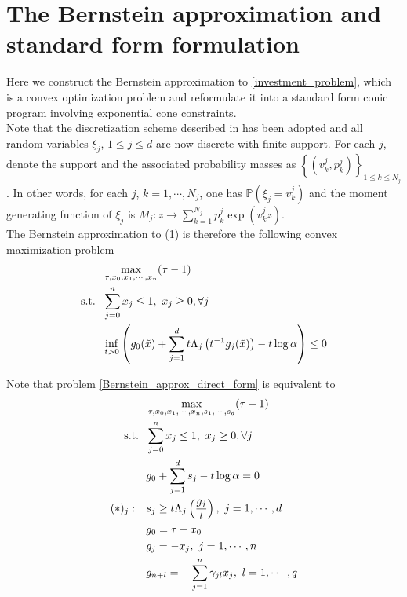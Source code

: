 \documentclass[11pt]{article}
\begin{document}
\section*{The Bernstein approximation and standard form formulation}
Here we construct the Bernstein approximation to \eqref{investment_problem}, which is a convex optimization problem and reformulate it into a standard form conic program involving exponential cone constraints. \\

Note that the discretization scheme described in \cite{Nemirovsky_and_Shapiro} has been adopted and all random variables $\xi_j$, $1\leq j \leq d$ are now discrete with finite support. For each $j$, denote the support and the associated probability masses as $\left\{(v_k^j, p_k^j)\right\}_{1\leq k \leq N_j}$. In other words, for each $j$, $k=1, \cdots, N_j$, one has $\mathbb{P}\left(\xi_j = v_k^j\right)$ and the moment generating function of $\xi_j$ is $M_j: z \rightarrow \sum_{k=1}^{N_j} p_k^j \exp \left(v_k^j z\right)$.\\

The Bernstein approximation to (1) is therefore the following convex maximization problem
\begin{align} \label{Bernstein_approx_direct_form}
\begin{split}
&\max_{\tau, x_0, x_1, \cdots, x_n} (\tau - 1) \\
\textnormal{s.t.}\ \ & \sum_{j=0}^n x_j \leq 1,\  x_j \geq 0,\forall j \\
&\inf_{t>0} \left(g_0(\tilde{x}) + \sum_{j=1}^d t \Lambda_j\left(t^{-1}g_j(\tilde{x})\right) - t\log \alpha \right) \leq 0
\end{split}
\end{align}

Note that problem \eqref{Bernstein_approx_direct_form} is equivalent to 
\begin{align}\label{Bernstein_approx_eq_form_1}
\begin{split}
&\max_{\tau, x_0, x_1, \cdots, x_n, s_1, \cdots, s_d} (\tau - 1)\\ \textnormal{s.t.}\ \ & \sum_{j=0}^n x_j \leq 1,\  x_j \geq 0,\forall j \\
&g_0 + \sum_{j=1}^d s_j - t\log \alpha = 0 \\
{(*)_j}:\ \ \ & s_j \geq t \Lambda_j\left(\dfrac{g_j}{t}\right),\ j=1, \cdots, d\ \ \ \\
& g_0 = \tau - x_0 \\
& g_j = -x_j,\ j = 1, \cdots, n \\
& g_{n+l} = -\sum_{j=1}^n \gamma_{jl}x_j,\ l=1,\cdots, q
\end{split}
\end{align}
\end{document}
